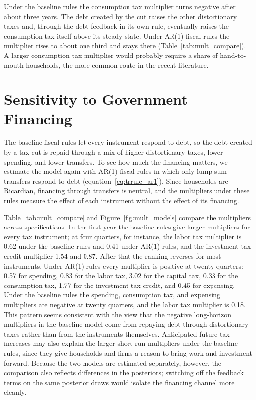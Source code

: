 \documentclass[article,11pt,letterpaper,fleqn]{article}
\theoremstyle{definition}
\numberwithin{equation}{section}
\begin{document}
Under the baseline rules the consumption tax multiplier turns negative after about three years. The debt created by the cut raises the other distortionary taxes and, through the debt feedback in its own rule, eventually raises the consumption tax itself above its steady state. Under AR(1) fiscal rules the multiplier rises to about one third and stays there (Table~\ref{tab:mult_compare}). A larger consumption tax multiplier would probably require a share of hand-to-mouth households, the more common route in the recent literature.

\section{Sensitivity to Government Financing}
\label{sec:financing}

The baseline fiscal rules let every instrument respond to debt, so the debt created by a tax cut is repaid through a mix of higher distortionary taxes, lower spending, and lower transfers. To see how much the financing matters, we estimate the model again with AR(1) fiscal rules in which only lump-sum transfers respond to debt (equation~\ref{eq:trrule_ar1}). Since households are Ricardian, financing through transfers is neutral, and the multipliers under these rules measure the effect of each instrument without the effect of its financing.

Table~\ref{tab:mult_compare} and Figure~\ref{fig:mult_models} compare the multipliers across specifications. In the first year the baseline rules give larger multipliers for every tax instrument; at four quarters, for instance, the labor tax multiplier is 0.62 under the baseline rules and 0.41 under AR(1) rules, and the investment tax credit multiplier 1.54 and 0.87. After that the ranking reverses for most instruments. Under AR(1) rules every multiplier is positive at twenty quarters: 0.57 for spending, 0.83 for the labor tax, 3.02 for the capital tax, 0.33 for the consumption tax, 1.77 for the investment tax credit, and 0.45 for expensing. Under the baseline rules the spending, consumption tax, and expensing multipliers are negative at twenty quarters, and the labor tax multiplier is 0.18. This pattern seems consistent with the view that the negative long-horizon multipliers in the baseline model come from repaying debt through distortionary taxes rather than from the instruments themselves. Anticipated future tax increases may also explain the larger short-run multipliers under the baseline rules, since they give households and firms a reason to bring work and investment forward. Because the two models are estimated separately, however, the comparison also reflects differences in the posteriors; switching off the feedback terms on the same posterior draws would isolate the financing channel more cleanly.
\end{document}
